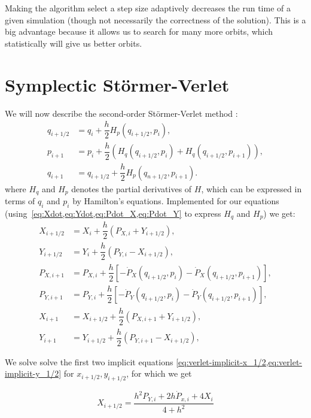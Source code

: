 Making the algorithm select a step size adaptively decreases the run time of a given simulation (though not necessarily the correctness of the solution). This is a big advantage because it allows us to search for many more orbits, which statistically will give us better orbits.

\section{Symplectic Störmer-Verlet}
We will now describe the second-order Störmer-Verlet method \cite{Hochbruck2008}:
\begin{align}
q_{i+1/2} &= q_i + \dfrac{h}{2}H_p(q_{i+1/2}, p_i), \\
p_{i+1} &= p_i + \dfrac{h}{2}(H_q(q_{i+1/2}, p_i) + H_q(q_{i+1/2}, p_{i+1})), \\
q_{i+1} &= q_{i+1/2} + \dfrac{h}{2}H_p(q_{n+1/2}, p_{i+1}).
\end{align}
where $H_q$ and $H_p$ denotes the partial derivatives of $H$, which can be expressed in terms of $q_i$ and $p_i$ by Hamilton's equations. Implemented for our equations (using~\cref{eq:Xdot,eq:Ydot,eq:Pdot_X,eq:Pdot_Y} to express $H_q$ and $H_p$) we get:
\begin{align}
X_{i+1/2} &= X_i + \dfrac{h}{2} (P_{X,i} + Y_{i+1/2}) , \label{eq:verlet-implicit-x_1/2} \\[0.3cm]
Y_{i+1/2} &= Y_i + \dfrac{h}{2} (P_{Y,i} - X_{i+1/2}), \label{eq:verlet-implicit-y_1/2} \\[0.8cm]
%
%
P_{X,i+1} &= P_{X,i} + \dfrac{h}{2} \left[-\dot{P}_X(q_{i+1/2},p_i) -\dot{P}_X(q_{i+1/2},p_{i+1}) \right], \label{eq:verlet-implicit-px_1} \\[0.3cm]
%
P_{Y,i+1} &= P_{Y,i} + \dfrac{h}{2} \left[-\dot{P}_Y(q_{i+1/2},p_i) -\dot{P}_Y(q_{i+1/2},p_{i+1}) \right], \label{eq:verlet-implicit-py_1} \\[0.8cm]
%
%
X_{i+1} &= X_{i+1/2} + \dfrac{h}{2} (P_{X,i+1} + Y_{i+1/2}), \label{eq:verlet-explicit-x_1} \\[0.3cm]
Y_{i+1} &= Y_{i+1/2} + \dfrac{h}{2} (P_{Y,i+1} - X_{i+1/2}), \label{eq:verlet-explicit-y_1}
\end{align}


We solve solve the first two implicit equations \cref{eq:verlet-implicit-x_1/2,eq:verlet-implicit-y_1/2} for \(x_{i+1/2},y_{i+1/2}\), for which we get

\begin{equation}
    X_{i+1/2} = \frac{h^2 P_{Y,i} + 2 h \dot{P}_{x,i} + 4 X_i}{4 + h^2} \label{eq:verlet-explicit-x_1/2}
\end{equation}

